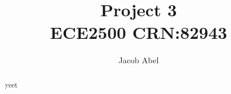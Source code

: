 \documentclass[12pt,letterpaper, onecolumn]{IEEEtran}
\author{Jacob Abel}
\title{	Project 3
	\\\large ECE2500 CRN:82943
}
\begin{document}
\maketitle
\begin{raggedright}

\begin{abstract}
yeet
\end{abstract}


\end{raggedright}
\end{document}
